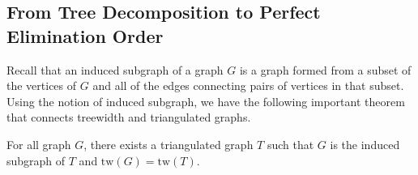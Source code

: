 \subsection{From Tree Decomposition to Perfect Elimination Order}

Recall that an induced subgraph of a graph $G$ is a graph formed from a subset of the vertices of $G$ and all of the edges connecting pairs of vertices in that subset.
Using the notion of induced subgraph, we have the following important theorem that connects treewidth and triangulated graphs.

\begin{theorem}\label{thm:treewidth_triangulated_graph}
	For all graph $G$, there exists a triangulated graph $T$ such that $G$ is the induced subgraph of $T$ and $\text{tw}(G) = \text{tw}(T)$.
\end{theorem}

